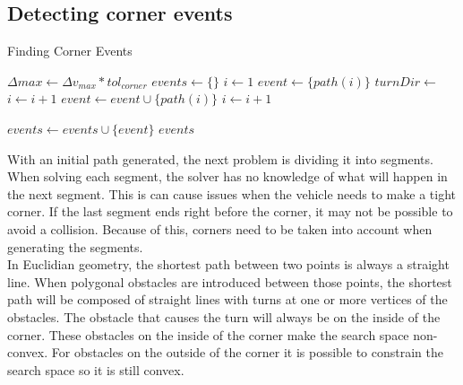\subsection{Detecting corner events}
\begin{algorithm}
\caption{Finding Corner Events}
\label{alg:corners}
\begin{algorithmic}[1]
  \State $\Delta max \leftarrow \Delta v_{max} * tol_{corner}$
  \State $events \leftarrow \{\}$ 
  \State $i \leftarrow 1$ 
   
  	\State $event \leftarrow \{ path(i) \}$ 
  	\State $turnDir \leftarrow$  
    	\State $i \leftarrow  i + 1$
    		\Break {}
	\EndIf
		\Break {}
	\EndIf
	\State $event \leftarrow event \cup \{ path(i) \}$
	\State $i \leftarrow  i + 1$
	
    	\EndWhile
    	
    	\State $events \leftarrow events \cup \{ event \}$
  \EndWhile
\Return $events$
\EndFunction
\end{algorithmic}
\end{algorithm}
With an initial path generated, the next problem is dividing it into segments. When solving each segment, the solver has no knowledge of what will happen in the next segment. This is can cause issues when the vehicle needs to make a tight corner. If the last segment ends right before the corner, it may not be possible to avoid a collision. Because of this, corners need to be taken into account when generating the segments. \\
In Euclidian geometry, the shortest path between two points is always a straight line. When polygonal obstacles are introduced between those points, the shortest path will be composed of straight lines with turns at one or more vertices of the obstacles. The obstacle that causes the turn will always be on the inside of the corner. These obstacles on the inside of the corner make the search space non-convex. For obstacles on the outside of the corner it is possible to constrain the search space so it is still convex.\\
